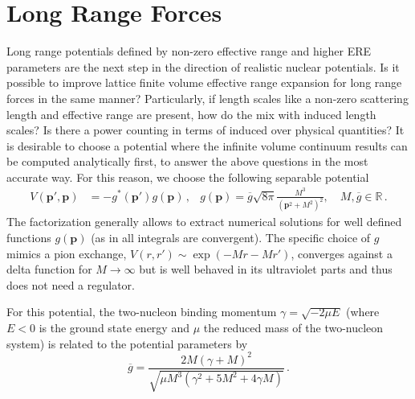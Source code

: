 \documentclass[
    aps,
    prl,
    showkeys,
    nofootinbib,
    floatfix
]{revtex4-1}
\renewcommand{\vec}[1]{\boldsymbol{#1}}
\begin{document}
\section{Long Range Forces}
Long range potentials defined by non-zero effective range and higher ERE parameters are the next step in the direction of realistic nuclear potentials.
Is it possible to improve lattice finite volume effective range expansion for long range forces in the same manner?
Particularly, if length scales like a non-zero scattering length and effective range are present, how do the mix with induced length scales?
Is there a power counting in terms of induced over physical quantities?
It is desirable to choose a potential where the infinite volume continuum results can be computed analytically first, to answer the above questions in the most accurate way.
For this reason, we choose the following separable potential
\begin{align}
	V(\vec p', \vec p) &= - g^*(\vec p') g(\vec p) \, ,
	&
	g(\vec{p})=\overline{g} \sqrt{8 \pi} \frac{M^{3}}{\left(\vec{p}^{2}+M^{2}\right)^{2}}, \quad M, \overline{g} \in \mathbb{R}
	\, .
\end{align}
The factorization generally allows to extract numerical solutions for well defined functions $g(\vec p)$ (as in all integrals are convergent).
The specific choice of $g$ mimics a pion exchange, $V(r, r') \sim \exp(- M r - M r')$, converges against a delta function for $M\to \infty$ but is well behaved in its ultraviolet parts and thus does not need a regulator.

For this potential, the two-nucleon binding momentum $\gamma = \sqrt{-2 \mu E}$ (where $E < 0$ is the ground state energy and $\mu$ the reduced mass of the two-nucleon system) is related to the potential parameters by
\begin{equation}\label{def:g-lr-binding}
	\overline{g} = \frac{2M(\gamma+M)^{2}}{\sqrt{\mu M^{3}\left(\gamma^{2}+5 M^{2}+4 \gamma M\right)}} \, .
\end{equation}
\end{document}
